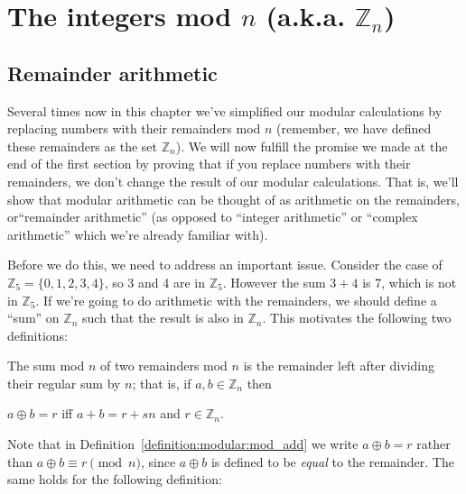 \section{The integers mod $n$ (a.k.a. ${\mathbb Z}_n$)\quad
{}}\label{sec:intMod_n}

\subsection{Remainder arithmetic}\label{ArithWithRems}
Several times now in this chapter we've simplified our modular calculations by replacing numbers with their remainders mod $n$ (remember, we have defined these remainders as the set ${\mathbb Z}_n$).  We will now fulfill the promise we made at the end of the first section by proving that if you replace numbers with their remainders, we don't change the result of our modular calculations.  That is, we'll show that modular arithmetic can be thought of as arithmetic on the remainders, or``remainder arithmetic'' (as opposed to ``integer arithmetic'' or ``complex arithmetic'' which we're already familiar with).

Before we do this, we need to address an important issue. Consider the case of $\mathbb{Z}_5 = \{0,1,2,3,4\}$, so 3 and 4 are in $\mathbb{Z}_5$. However the sum $3 + 4$ is 7, which is not in $\mathbb{Z}_5$. If we're going to do arithmetic with the remainders, we should define a ``sum'' on $\mathbb{Z}_n$ such that the result is also in $\mathbb{Z}_n$. This motivates the following two definitions:




\begin{defn}\label{definition:modular:mod_add}

\noindent
The sum mod $n$ of two remainders mod $n$ is the remainder left after dividing their regular sum by $n$; that is, if $a,b \in {\mathbb Z}_n$ then

\begin{center}
$a \oplus b = r$ iff  $a + b = r + sn$ and 
$r \in {\mathbb Z}_n.$
\end{center}
\end{defn}
Note that in Definition~\ref{definition:modular:mod_add} we write $a \oplus b = r$ rather than $a \oplus b \equiv r \pmod{n}$, since $a \oplus b$ is defined to be \emph{equal} to the remainder. The same holds for the following definition:

